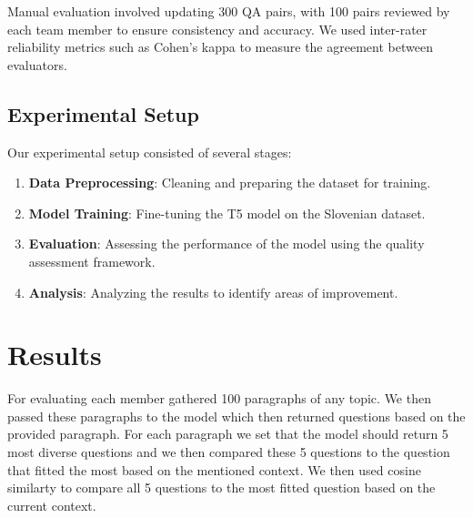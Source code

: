 \documentclass[fleqn,moreauthors,10pt]{ds_report}
\begin{document}
Manual evaluation involved updating 300 QA pairs, with 100 pairs reviewed by each team member to ensure consistency and accuracy. We used inter-rater reliability metrics such as Cohen’s kappa to measure the agreement between evaluators.

\subsection*{Experimental Setup}
Our experimental setup consisted of several stages:
\begin{enumerate}[noitemsep]
    \item \textbf{Data Preprocessing}: Cleaning and preparing the dataset for training.
    \item \textbf{Model Training}: Fine-tuning the T5 model on the Slovenian dataset.
    \item \textbf{Evaluation}: Assessing the performance of the model using the quality assessment framework.
    \item \textbf{Analysis}: Analyzing the results to identify areas of improvement.
\end{enumerate}


\section*{Results}
For evaluating each member gathered 100 paragraphs of any topic. We then passed these paragraphs to the model which then returned questions based on the provided paragraph. For each paragraph we set that the model should return 5 most diverse questions and we then compared these 5 questions to the question that fitted the most based on the mentioned context. We then used cosine similarty to compare all 5 questions to the most fitted question based on the current context.

\end{document}
